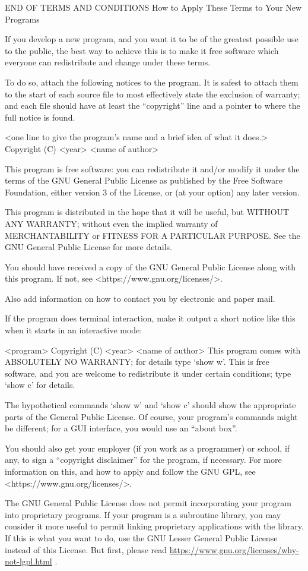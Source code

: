END OF TERMS AND CONDITIONS
How to Apply These Terms to Your New Programs

If you develop a new program, and you want it to be of the greatest possible use to the public, the best way to achieve this is to make it free software which everyone can redistribute and change under these terms.

To do so, attach the following notices to the program. It is safest to attach them to the start of each source file to most effectively state the exclusion of warranty; and each file should have at least the “copyright” line and a pointer to where the full notice is found.
\begin{center}
    <one line to give the program's name and a brief idea of what it does.>
    Copyright (C) <year>  <name of author>

    This program is free software: you can redistribute it and/or modify
    it under the terms of the GNU General Public License as published by
    the Free Software Foundation, either version 3 of the License, or
    (at your option) any later version.

    This program is distributed in the hope that it will be useful,
    but WITHOUT ANY WARRANTY; without even the implied warranty of
    MERCHANTABILITY or FITNESS FOR A PARTICULAR PURPOSE.  See the
    GNU General Public License for more details.

    You should have received a copy of the GNU General Public License
    along with this program.  If not, see <https://www.gnu.org/licenses/>.
\end{center}
Also add information on how to contact you by electronic and paper mail.

If the program does terminal interaction, make it output a short notice like this when it starts in an interactive mode:

    <program>  Copyright (C) <year>  <name of author>
    This program comes with ABSOLUTELY NO WARRANTY; for details type `show w'.
    This is free software, and you are welcome to redistribute it
    under certain conditions; type `show c' for details.

The hypothetical commands `show w' and `show c' should show the appropriate parts of the General Public License. Of course, your program's commands might be different; for a GUI interface, you would use an “about box”.

You should also get your employer (if you work as a programmer) or school, if any, to sign a “copyright disclaimer” for the program, if necessary. For more information on this, and how to apply and follow the GNU GPL, see <https://www.gnu.org/licenses/>.

The GNU General Public License does not permit incorporating your program into proprietary programs. If your program is a subroutine library, you may consider it more useful to permit linking proprietary applications with the library. If this is what you want to do, use the GNU Lesser General Public License instead of this License. But first, please read \url{https://www.gnu.org/licenses/why-not-lgpl.html} .
